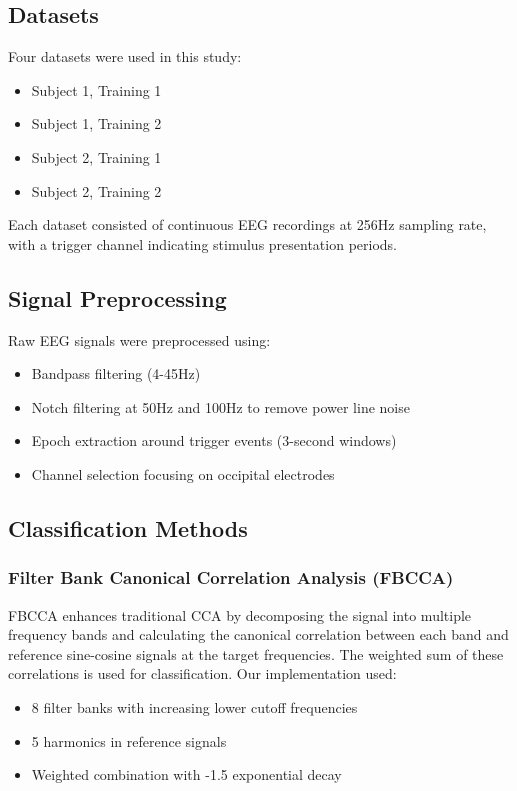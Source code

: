 \documentclass[conference]{IEEEtran}
\begin{document}
\subsection{Datasets}
Four datasets were used in this study:
\begin{itemize}
    \item Subject 1, Training 1
    \item Subject 1, Training 2
    \item Subject 2, Training 1
    \item Subject 2, Training 2
\end{itemize}

Each dataset consisted of continuous EEG recordings at 256Hz sampling rate, with a trigger channel indicating stimulus presentation periods.

\subsection{Signal Preprocessing}
Raw EEG signals were preprocessed using:
\begin{itemize}
    \item Bandpass filtering (4-45Hz)
    \item Notch filtering at 50Hz and 100Hz to remove power line noise
    \item Epoch extraction around trigger events (3-second windows)
    \item Channel selection focusing on occipital electrodes
\end{itemize}

\subsection{Classification Methods}

\subsubsection{Filter Bank Canonical Correlation Analysis (FBCCA)}
FBCCA enhances traditional CCA by decomposing the signal into multiple frequency bands and calculating the canonical correlation between each band and reference sine-cosine signals at the target frequencies. The weighted sum of these correlations is used for classification. Our implementation used:
\begin{itemize}
    \item 8 filter banks with increasing lower cutoff frequencies
    \item 5 harmonics in reference signals
    \item Weighted combination with -1.5 exponential decay
\end{itemize}
\end{document}
